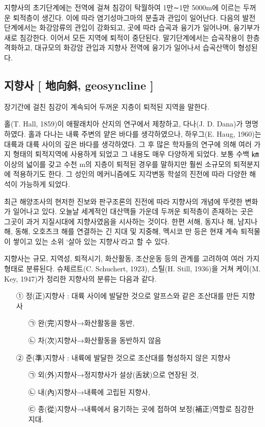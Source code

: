 \documentclass[12pt,a4paper]{book}
\begin{document}
		지향사의 초기단계에는 전역에 걸쳐 침강이 탁월하여 1만∼1만 5000m에 이르는 두꺼운 퇴적층이 생긴다. 
		이에 따라 염기성마그마의 분출과 관입이 일어난다. 
		다음의 발전단계에서는 화강암류의 관입이 강화되고, 곳에 따라 습곡과 융기가 일어나며, 융기부가 새로 침강한다. 
		이어서 모든 지역에 퇴적이 중단된다. 
		말기단계에서는 습곡작용이 한층 격화하고, 대규모의 화강암 관입과 지향사 전역에 융기가 일어나서 습곡산맥이 형성된다. 



	\subsection{지향사 [ 地向斜, geosyncline ] }


		장기간에 걸친 침강이 계속되어 두꺼운 지층이 퇴적된 지역을 말한다. 

		홀(T. Hall, 1859)이 애팔래치아 산지의 연구에서 제창하고, 다나(J. D. Dana)가 명명하였다. 
		홀과 다나는 내륙 주변의 얕은 바다를 생각하였으나, 하우그(E. Haug, 1960)는 대륙과 대륙 사이의 깊은 바다를 생각하였다. 
		그 후 많은 학자들의 연구에 의해 여러 가지 형태의 퇴적지역에 사용하게 되었고 그 내용도 매우 다양하게 되었다. 
		보통 수백 ㎞ 이상의 넓이를 갖고 수천 m의 지층이 퇴적된 경우를 말하지만 훨씬 소규모의 퇴적분지에 적용하기도 한다. 
		그 성인의 메커니즘에도 지각변동 학설의 진전에 따라 다양한 해석이 가능하게 되었다. 

		최근 해양조사의 현저한 진보와 판구조론의 진전에 따라 지향사의 개념에 뚜렷한 변화가 일어나고 있다. 
		오늘날 세계적인 대산맥들 가운데 두꺼운 퇴적층이 존재하는 곳은 그곳이 과거 지질시대에 지향사였음을 시사하는 것이다. 
		한편 서해, 동지나 해, 남지나 해, 동해, 오호츠크 해를 연결하는 긴 지대 및 지중해, 멕시코 만 등은 
		현재 계속 퇴적물이 쌓이고 있는 소위 ‘살아 있는 지향사’라고 할 수 있다. 

		지향사는 규모, 지역성, 퇴적시기, 화산활동, 조산운동 등의 관계를 고려하여 여러 가지 형태로 분류된다. 
		슈체르트(C. Schuchert, 1923), 스틸(H. Still, 1936)을 거쳐 케이(M. Key, 1947)가 정리한 지향사의 분류는 다음과 같다.

		\begin{enumerate}
		\item[①]	정(正)지향사 : 대륙 사이에 발달한 것으로 알프스와 같은 조산대를 만든 지향사 
				\begin{enumerate}
				\item[㉠] 완(完)지향사→화산활동을 동반, 
				\item[㉡] 차(次)지향사→화산활동을 동반하지 않음
				\end{enumerate}
		\item[②] 준(準)지향사 : 내륙에 발달한 것으로 조산대를 형성하지 않은 지향사 
				\begin{enumerate}
				\item[㉠] 외(外)지향사→정지향사가 설상(舌狀)으로 연장된 것, 
				\item[㉡] 내(內)지향사→내륙에 고립된 지향사, 
				\item[㉢] 종(從)지향사→내륙에서 융기하는 곳에 접하여 보정(補正)역할로 침강한 지대.
				\end{enumerate}
		\end{enumerate}
\end{document}
